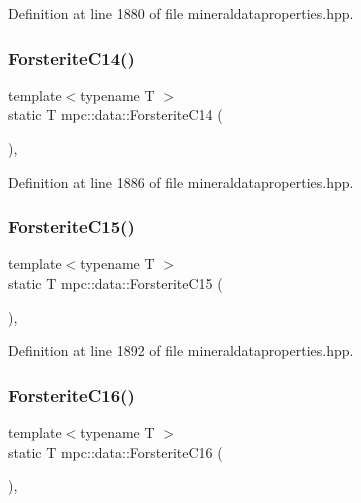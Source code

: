 Definition at line 1880 of file mineraldataproperties.\+hpp.

\mbox{\label{namespacempc_1_1data_a1bf5e2c7cdd8517953b8c56bca311803}} 
\subsubsection{\texorpdfstring{Forsterite\+C14()}{ForsteriteC14()}}
{\footnotesize\ttfamily template$<$typename T $>$ \\
static T mpc\+::data\+::\+Forsterite\+C14 (\begin{DoxyParamCaption}{ }\end{DoxyParamCaption})\hspace{0.3cm}{\ttfamily [inline]}, {\ttfamily [static]}}



Definition at line 1886 of file mineraldataproperties.\+hpp.

\mbox{\label{namespacempc_1_1data_a917eeffa08079985c639a9bb10e76d2c}} 
\subsubsection{\texorpdfstring{Forsterite\+C15()}{ForsteriteC15()}}
{\footnotesize\ttfamily template$<$typename T $>$ \\
static T mpc\+::data\+::\+Forsterite\+C15 (\begin{DoxyParamCaption}{ }\end{DoxyParamCaption})\hspace{0.3cm}{\ttfamily [inline]}, {\ttfamily [static]}}



Definition at line 1892 of file mineraldataproperties.\+hpp.

\mbox{\label{namespacempc_1_1data_ab06dd444b8377d5562408cb80a82fd88}} 
\subsubsection{\texorpdfstring{Forsterite\+C16()}{ForsteriteC16()}}
{\footnotesize\ttfamily template$<$typename T $>$ \\
static T mpc\+::data\+::\+Forsterite\+C16 (\begin{DoxyParamCaption}{ }\end{DoxyParamCaption})\hspace{0.3cm}{\ttfamily [inline]}, {\ttfamily [static]}}



